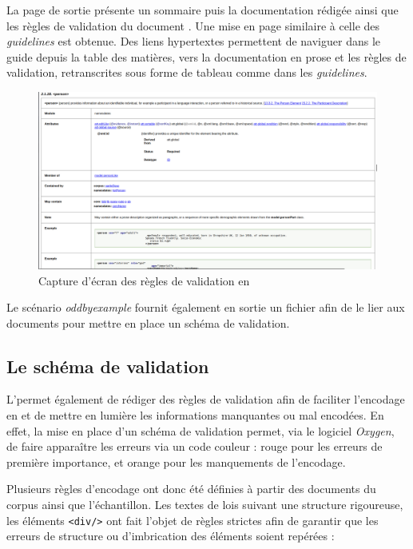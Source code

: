 La page \HTML de sortie présente un sommaire puis la documentation rédigée ainsi que les règles de validation du document \TEI. Une mise en page similaire à celle des \textit{guidelines} est obtenue. Des liens hypertextes permettent de naviguer dans le guide depuis la table des matières, vers la documentation en prose et les règles de validation, retranscrites sous forme de tableau comme dans les \textit{guidelines}.

\begin{figure}
    \centering
    \includegraphics[width=\textwidth]{images/odd2.png}
    \caption{Capture d'écran des règles de validation en \HTML}
\end{figure}

Le scénario \textit{oddbyexample} fournit également en sortie un fichier \RNG afin de le lier aux documents \TEI pour mettre en place un schéma de validation.

\newpage
\subsection{Le schéma de validation}

L'\ODD permet également de rédiger des règles de validation afin de faciliter l'encodage en \TEI et de mettre en lumière les informations manquantes ou mal encodées. En effet, la mise en place d'un schéma de validation permet, via le logiciel \textit{Oxygen}, de faire apparaître les erreurs via un code couleur : rouge pour les erreurs de première importance, et orange pour les manquements de l'encodage. 

Plusieurs règles d'encodage ont donc été définies à partir des documents du corpus ainsi que l'échantillon. Les textes de lois suivant une structure rigoureuse, les éléments \texttt{<div/>} ont fait l'objet de règles strictes afin de garantir que les erreurs de structure ou d'imbrication des éléments soient repérées : 

